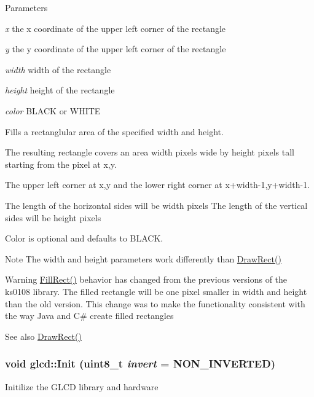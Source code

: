 \begin{DoxyParams}{Parameters}
\item[{\em x}]the x coordinate of the upper left corner of the rectangle \item[{\em y}]the y coordinate of the upper left corner of the rectangle \item[{\em width}]width of the rectangle \item[{\em height}]height of the rectangle \item[{\em color}]BLACK or WHITE\end{DoxyParams}
Fills a rectanglular area of the specified width and height.

The resulting rectangle covers an area width pixels wide by height pixels tall starting from the pixel at x,y.

The upper left corner at x,y and the lower right corner at x+width-\/1,y+width-\/1.

The length of the horizontal sides will be width pixels The length of the vertical sides will be height pixels

Color is optional and defaults to BLACK.

\begin{DoxyNote}{Note}
The width and height parameters work differently than \hyperlink{classglcd_adbbbba35a6019a7b050e6234619446c0}{DrawRect()}
\end{DoxyNote}
\begin{DoxyWarning}{Warning}
\hyperlink{classglcd_ac3ee3809429b633e17734b0b8ca7d010}{FillRect()} behavior has changed from the previous versions of the ks0108 library. The filled rectangle will be one pixel smaller in width and height than the old version. This change was to make the functionality consistent with the way Java and C\# create filled rectangles
\end{DoxyWarning}
\begin{DoxySeeAlso}{See also}
\hyperlink{classglcd_adbbbba35a6019a7b050e6234619446c0}{DrawRect()} 
\end{DoxySeeAlso}
\hypertarget{classglcd_aba75fe511781243aeb06df806bb4782a}{
\subsubsection[{Init}]{\setlength{\rightskip}{0pt plus 5cm}void glcd::Init (uint8\_\-t {\em invert} = {\ttfamily NON\_\-INVERTED})}}
\label{classglcd_aba75fe511781243aeb06df806bb4782a}
Initilize the GLCD library and hardware


